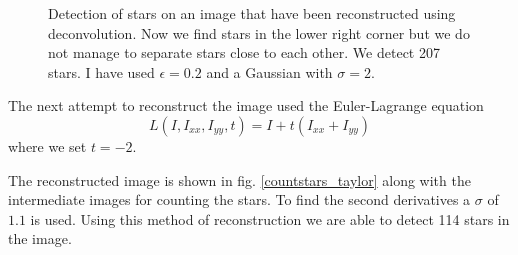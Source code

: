 \documentclass[a4paper, 10pt, final]{article}
\begin{document}
\begin{figure}[!h]
    \caption[]{Detection of stars on an image that have been
    reconstructed using deconvolution. Now we find stars in the lower
    right corner but we do not manage to separate stars close to each
    other. We detect 207 stars. I have used $\epsilon = 0.2$ and a
    Gaussian with $\sigma = 2$.}
    \label{countstars_inv}
\end{figure}

The next attempt to reconstruct the image used the Euler-Lagrange
equation
\begin{equation}
    L(I, I_{xx}, I_{yy}, t) = I + t(I_{xx}+I_{yy})
\end{equation}
where we set $t = -2$.

The reconstructed image is shown in fig. \ref{countstars_taylor} along
with the intermediate images for counting the stars. To find the second
derivatives a $\sigma$ of $1.1$ is used. Using this method of
reconstruction we are able to detect 114 stars in the image.
\end{document}
